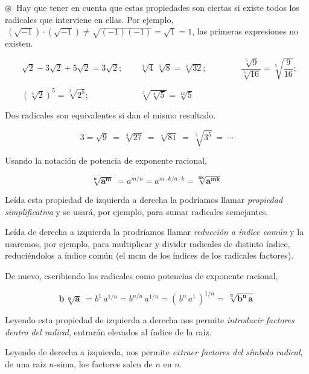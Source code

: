 $ \circledast \ $ Hay que tener en cuenta que estas propiedades son ciertas si existe todos los radicales que interviene en ellas. Por ejemplo, $\ (\sqrt{-1}) \cdot (\sqrt{-1}) \neq \sqrt{(-1)(-1)}=\sqrt{1}=1$, las primeras expresiones no existen.

\begin{miejemplo}

$\qquad \sqrt{2}-3\sqrt{2}+5\sqrt{2}=3\sqrt{2};\qquad \sqrt[3]{4}\, \sqrt[3]{8}=\sqrt[3]{32};\qquad \qquad \dfrac{\sqrt[5]{9}}{\sqrt[5]{16}}=\sqrt[5]{\dfrac{9}{16}};	$

$\qquad (\sqrt[3]{2})^5=\sqrt[3]{2^5} ; \qquad \qquad \qquad \sqrt[3]{\sqrt[4]{5}}=\sqrt[12]{5}$
\end{miejemplo}


\vspace{5mm} \begin{definition}
 
 	Dos radicales son equivalentes si dan el mismo resultado.
 	
$$3=\sqrt{9}\ =\ \sqrt[3]{27}\ = \ \sqrt[4]{81}\ = \ \sqrt[5]{3^5}\ = \ \cdots $$
 	
\vspace{2mm} 	Usando la notación de potencia de exponente racional,
 	
 	$$\boldsymbol{ \sqrt[n]{a^m}} \ =a^{m/n}=a^{m\cdot k/n\cdot k}= \boldsymbol{ \sqrt[nk]{a^{mk}}} $$
 	
\vspace{2mm} Leída esta propiedad de izquierda a derecha la podríamos llamar \emph{propiedad simplificativa} y se usará, por ejemplo, para sumar radicales semejantes. 
 
\vspace{2mm} Leída de derecha a izquierda la prodríamos llamar \emph{reducción a índice común} y la usaremos, por ejemplo, para multiplicar y dividir radicales de distinto índice, reduciéndolos a índice común (el mcm de los índices de los radicales factores).
 \end{definition}
 
 
\vspace{5mm} \begin{definition}

De nuevo, escribiendo los radicales como potencias  de exponente racional,

$$\boldsymbol{ b\, \sqrt[n]{a} } \ =  b^1\, a^{1/n} =b^{n/n}\, a^{1/n}= (\, b^n\, a^1\, )^{1/n}= \ \boldsymbol{\sqrt[n]{b^n\, a} }$$

\vspace{2mm} Leyendo esta propiedad de izquierda a derecha nos permite \emph{introducir factores dentro del radical}, entrarán elevados al índice de la raíz.

\vspace{2mm} Leyendo de derecha a izquierda, nos permite	 \emph{extraer factores del símbolo radical}, de una raíz $n$-sima, los factores salen de $n$ en $n$.
 \end{definition}

